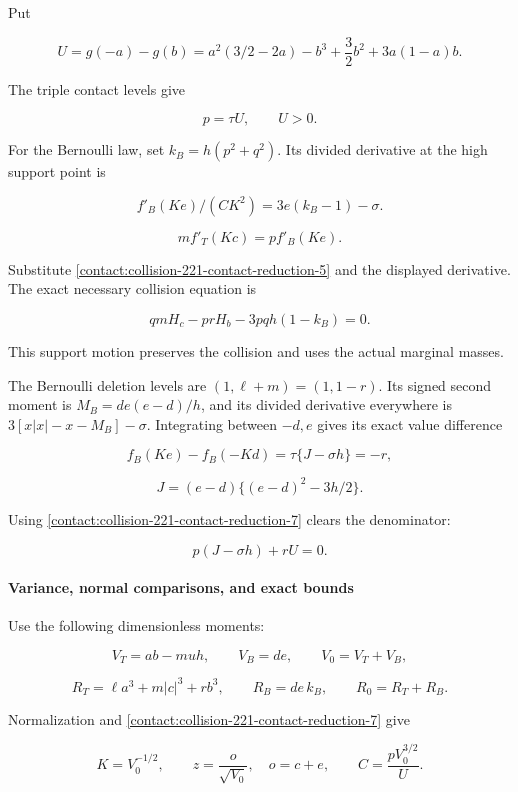 Put

\[
 U=g(-a)-g(b)
   =a^2(3/2-2a)-b^3+\frac32b^2+3a(1-a)b.
\]

The triple contact levels give

\[
 \boxed{\quad p=\tau U,\qquad U>0.\quad}
\tag{B.15.7}\label{contact:collision-221-contact-reduction-7}
\]

For the Bernoulli law, set $k_B=h(p^2+q^2)$. Its divided derivative at
the high support point is

\[
 f'_B(Ke)/(CK^2)=3e(k_B-1)-\sigma.
\]

\[
 m f'_T(Kc)=p f'_B(Ke).
\]

Substitute \eqref{contact:collision-221-contact-reduction-5} and the displayed derivative. The exact necessary
collision equation is

\[
 \boxed{\quad q mH_c-p rH_b-3pq h(1-k_B)=0.\quad}
\tag{B.15.8}\label{contact:collision-221-contact-reduction-8}
\]

This support motion preserves the collision and uses the actual marginal masses.

The Bernoulli deletion levels are $(1,\ell+m)=(1,1-r)$. Its signed second
moment is $M_B=de(e-d)/h$, and its divided derivative everywhere is
$3[x|x|-x-M_B]-\sigma$. Integrating between $-d,e$ gives its exact value
difference

\[
 f_B(Ke)-f_B(-Kd)
 =\tau\{J-\sigma h\}=-r,
\]

\[
 J=(e-d)\{(e-d)^2-3h/2\}.
\]

Using \eqref{contact:collision-221-contact-reduction-7} clears the denominator:

\[
 \boxed{\quad p(J-\sigma h)+rU=0.\quad}
\tag{B.15.9}\label{contact:collision-221-contact-reduction-9}
\]

\paragraph{Variance, normal comparisons, and exact bounds}

Use the following dimensionless moments:

\[
 V_T=ab-muh,\qquad V_B=de,\qquad V_0=V_T+V_B,
\]

\[
 R_T=\ell a^3+m|c|^3+r b^3,\qquad R_B=de\,k_B,
 \qquad R_0=R_T+R_B.
\]

Normalization and \eqref{contact:collision-221-contact-reduction-7} give

\[
 K=V_0^{-1/2},\qquad z=\frac{o}{\sqrt{V_0}},\quad o=c+e,
 \qquad C=\frac{pV_0^{3/2}}U.
\tag{B.15.10}\label{contact:collision-221-contact-reduction-10}
\]

